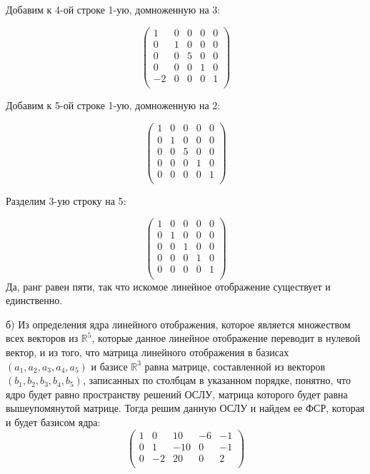 	Добавим к 4-ой строке 1-ую, домноженную на 3:
	
	\[
	\begin{pmatrix}
	1 & 0 & 0 & 0 & 0 \\
	0 & 1 & 0 & 0 & 0 \\
	0 & 0 & 5 & 0 & 0 \\
	0 & 0 & 0 & 1 & 0 \\
	-2 & 0 & 0 & 0 & 1 \\
	\end{pmatrix}
	\]
	
	Добавим к 5-ой строке 1-ую, домноженную на 2:
	
	\[
	\begin{pmatrix}
	1 & 0 & 0 & 0 & 0 \\
	0 & 1 & 0 & 0 & 0 \\
	0 & 0 & 5 & 0 & 0 \\
	0 & 0 & 0 & 1 & 0 \\
	0 & 0 & 0 & 0 & 1 \\
	\end{pmatrix}
	\]
	
	Разделим 3-ую строку на 5:
	
	\[
	\begin{pmatrix}
	1 & 0 & 0 & 0 & 0 \\
	0 & 1 & 0 & 0 & 0 \\
	0 & 0 & 1 & 0 & 0 \\
	0 & 0 & 0 & 1 & 0 \\
	0 & 0 & 0 & 0 & 1 \\
	\end{pmatrix}
	\]
	Да, ранг равен пяти, так что искомое линейное отображение существует и единственно.
	
	б) Из определения ядра линейного отображения, которое является множеством всех векторов из $\mathbb{R}^5$, которые данное линейное отображение переводит в нулевой вектор, и из того, что матрица линейного отображения в базисах $(a_1, a_2, a_3, a_4, a_5)$ и базисе $\mathbb{R}^3$ равна матрице, составленной из векторов $(b_1, b_2, b_3, b_4, b_5)$, записанных по столбцам в указанном порядке, понятно, что ядро будет равно пространству решений ОСЛУ, матрица которого будет равна вышеупомянутой матрице. Тогда решим данную ОСЛУ и найдем ее ФСР, которая и будет базисом ядра: \\
	\[
	\begin{pmatrix}
	1 & 0 & 10 & -6 & -1 \\
	0 & 1 & -10 & 0 & -1 \\
	0 & -2 & 20 & 0 & 2 \\
	\end{pmatrix}
	\]
	
